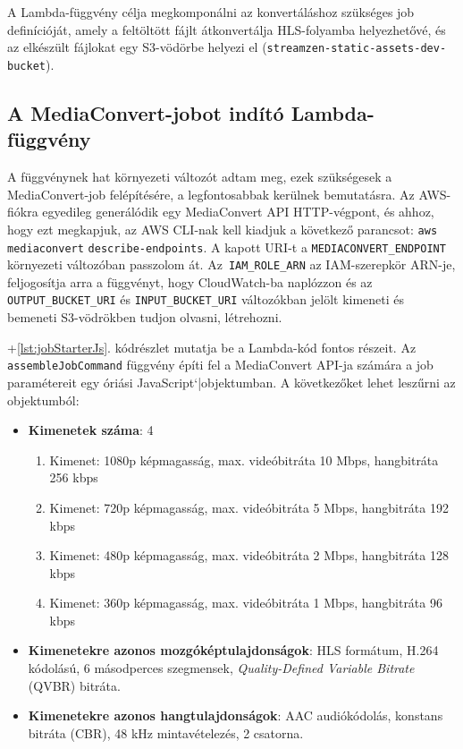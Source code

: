 A Lambda-függvény célja megkomponálni az konvertáláshoz szükséges job definícióját, amely a feltöltött fájlt átkonvertálja HLS-folyamba helyezhetővé, és az elkészült fájlokat egy S3-vödörbe helyezi el (\verb|streamzen-static-assets-dev-bucket|).

\subsection{A MediaConvert-jobot indító Lambda-függvény}\label{sec:jobStarter}

A függvénynek hat környezeti változót adtam meg, ezek szükségesek a MediaConvert-job felépítésére, a legfontosabbak kerülnek bemutatásra. Az AWS-fiókra egyedileg generálódik egy MediaConvert API HTTP-végpont, és ahhoz, hogy ezt megkapjuk, az AWS CLI-nak kell kiadjuk a következő parancsot: \verb|aws| \verb|mediaconvert| \verb|describe-endpoints|. A kapott URI-t a \verb|MEDIACONVERT_ENDPOINT| környezeti változóban passzolom át. Az~\verb|IAM_ROLE_ARN| az IAM-szerepkör ARN-je, feljogosítja arra a függvényt, hogy CloudWatch-ba naplózzon és az \verb|OUTPUT_BUCKET_URI| és \verb|INPUT_BUCKET_URI| változókban jelölt kimeneti és bemeneti S3-vödrökben tudjon olvasni, létrehozni.

\Az+\ref{lst:jobStarterJs}. kódrészlet mutatja be a Lambda-kód fontos részeit. Az \verb|assembleJobCommand| függvény építi fel a MediaConvert API-ja számára a job paramétereit egy óriási JavaScript`|objektumban. A következőket lehet leszűrni az objektumból:

\begin{itemize}
  \setlength{\itemsep}{1pt}
  \setlength{\parskip}{0pt}
  \setlength{\parsep}{0pt}
  \item \textbf{Kimenetek száma}: 4
        \begin{enumerate}
          \setlength{\itemsep}{1pt}
          \setlength{\parskip}{0pt}
          \setlength{\parsep}{0pt}
          \item Kimenet: 1080p képmagasság, max. videóbitráta 10 Mbps, hangbitráta 256 kbps
          \item Kimenet: 720p képmagasság, max. videóbitráta 5 Mbps, hangbitráta 192 kbps
          \item Kimenet: 480p képmagasság, max. videóbitráta 2 Mbps, hangbitráta 128 kbps
          \item Kimenet: 360p képmagasság, max. videóbitráta 1 Mbps, hangbitráta 96 kbps
        \end{enumerate}
  \item \textbf{Kimenetekre azonos mozgóképtulajdonságok}: HLS formátum, H.264 kódolású, 6 másodperces szegmensek, \emph{Quality-Defined Variable Bitrate} (QVBR) bitráta\cite{qvbr}.
  \item \textbf{Kimenetekre azonos hangtulajdonságok}: AAC audiókódolás, konstans bitráta (CBR), 48 kHz mintavételezés, 2 csatorna.
\end{itemize}


